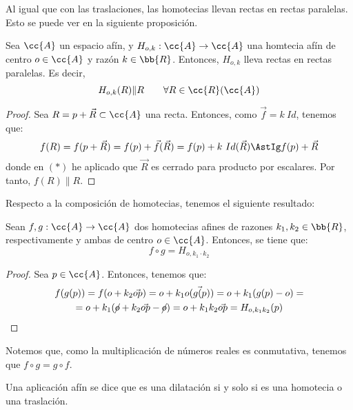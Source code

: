 Al igual que con las traslaciones, las homotecias llevan rectas en rectas paralelas. Esto se puede ver en la siguiente proposición.
\begin{prop}
    Sea $\cc{A}$ un espacio afín, y $H_{o,k}:\cc{A}\to \cc{A}$ una homtecia afín de centro $o\in \cc{A}$ y razón $k\in \bb{R}$. Entonces, $H_{o,k}$ lleva rectas en rectas paralelas. Es decir,
    \begin{equation*}
        H_{o,k}(R)\| R \qquad \forall R\in \cc{R}(\cc{A})
    \end{equation*}
\end{prop}
\begin{proof}
    Sea $R=p+\vec{R}\subset \cc{A}$ una recta. Entonces, como $\vec{f}=k~Id$, tenemos que:
    \begin{equation*}
        f(R) = f(p+\vec{R}) = f(p) + \vec{f}(\vec{R}) = f(p) + k~Id(\vec{R}) \AstIg f(p) + \vec{R}
    \end{equation*}
    donde en $(\ast)$ he aplicado que $\vec{R}$ es cerrado para producto por escalares. Por tanto, $f(R)\| R$.
\end{proof}

Respecto a la composición de homotecias, tenemos el siguiente resultado:
\begin{prop}
    Sean $f,g:\cc{A}\to \cc{A}$ dos homotecias afines de razones $k_1,k_2\in \bb{R}$, respectivamente y ambas de centro $o\in \cc{A}$. Entonces, se tiene que:
    \begin{equation*}
        f\circ g = H_{o,k_1\cdot k_2}
    \end{equation*}
\end{prop}
\begin{proof}
    Sea $p\in \cc{A}$. Entonces, tenemos que:
    \begin{multline*}
        f(g(p)) = f(o+k_2\vec{op}) = o+k_1\vec{o(g(p))} = o + k_1(g(p)-o) =\\= o + k_1(\cancel{o}+k_2\vec{op}-\cancel{o}) = o + k_1k_2\vec{op} = H_{o,k_1k_2}(p) \qedhere
    \end{multline*}
\end{proof}
Notemos que, como la multiplicación de números reales es conmutativa, tenemos que $f\circ g = g\circ f$.


\begin{definicion}
    Una aplicación afín se dice que es una dilatación si y solo si es una homotecia o una traslación.
\end{definicion}

